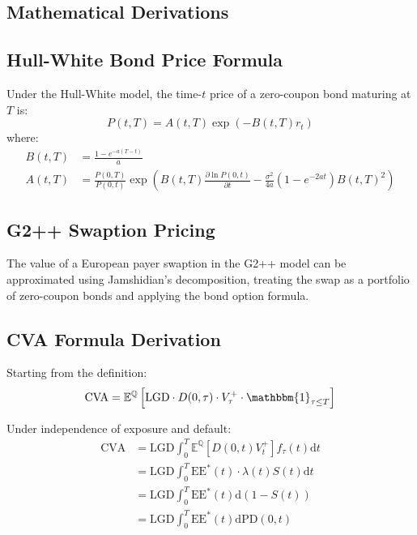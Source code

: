 \documentclass[11pt,a4paper]{article}
\theoremstyle{definition}
\newcommand{\E}{\mathbb{E}}
\newcommand{\Q}{\mathbb{Q}}
\newcommand{\ind}{\mathbbm{1}}
\newcommand{\diff}{\mathrm{d}}
\newcommand{\LGD}{\mathrm{LGD}}
\newcommand{\PD}{\mathrm{PD}}
\newcommand{\EE}{\mathrm{EE}}
\newcommand{\CVA}{\mathrm{CVA}}
\begin{document}
\newpage
\begin{appendices}

\section{Mathematical Derivations}

\subsection{Hull-White Bond Price Formula}

Under the Hull-White model, the time-$t$ price of a zero-coupon bond maturing at $T$ is:
\begin{equation}
P(t,T) = A(t,T) \exp(-B(t,T) r_t)
\end{equation}
where:
\begin{align}
B(t,T) &= \frac{1 - e^{-a(T-t)}}{a} \\
A(t,T) &= \frac{P(0,T)}{P(0,t)} \exp\left( B(t,T) \frac{\partial \ln P(0,t)}{\partial t} - \frac{\sigma^2}{4a}(1-e^{-2at})B(t,T)^2 \right)
\end{align}

\subsection{G2++ Swaption Pricing}

The value of a European payer swaption in the G2++ model can be approximated using Jamshidian's decomposition, treating the swap as a portfolio of zero-coupon bonds and applying the bond option formula.

\subsection{CVA Formula Derivation}

Starting from the definition:
\begin{equation}
\CVA = \E^{\Q}\left[ \LGD \cdot D(0,\tau) \cdot V_\tau^+ \cdot \ind_{\tau \leq T} \right]
\end{equation}

Under independence of exposure and default:
\begin{align}
\CVA &= \LGD \int_0^T \E^{\Q}\left[ D(0,t) V_t^+ \right] f_\tau(t) \diff t \\
&= \LGD \int_0^T \EE^*(t) \cdot \lambda(t) S(t) \diff t \\
&= \LGD \int_0^T \EE^*(t) \diff(1 - S(t)) \\
&= \LGD \int_0^T \EE^*(t) \diff \PD(0,t)
\end{align}


\end{appendices}
\end{document}
